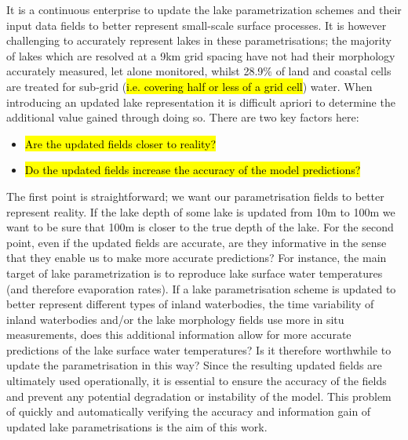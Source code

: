 \documentclass[hess, manuscript]{copernicus}
\begin{document}
\noindent It is a continuous enterprise to update the lake parametrization schemes and their input data fields to better represent small-scale surface processes. It is however challenging to accurately represent lakes in these parametrisations; the majority of lakes which are resolved at a 9km grid spacing have not had their morphology accurately measured, let alone monitored, whilst 28.9$\%$ of land and coastal cells are treated for sub-grid (\hl{i.e. covering half or less of a grid cell}) water. When introducing an updated lake representation it is difficult apriori to determine the additional value gained through doing so. There are two key factors here:
\begin{itemize}
	\item \hl{Are the updated fields closer to reality?}
	\item \hl{Do the updated fields increase the accuracy of the model predictions?} 
\end{itemize}
The first point is straightforward; we want our parametrisation fields to better represent reality. If the lake depth of some lake is updated from 10m to 100m we want to be sure that 100m is closer to the true depth of the lake. For the second point, even if the updated fields are accurate, are they informative in the sense that they enable us to make more accurate predictions? For instance, the main target of lake parametrization is to reproduce lake surface water temperatures (and therefore evaporation rates). If a lake parametrisation scheme is updated to better represent different types of inland waterbodies, the time variability of inland waterbodies and/or the lake morphology fields use more in situ measurements, does this additional information allow for more accurate predictions of the lake surface water temperatures? Is it therefore worthwhile to update the parametrisation in this way? Since the resulting updated fields are ultimately used operationally, it is essential to ensure the accuracy of the fields and prevent any potential degradation or instability of the model. This problem of quickly and automatically verifying the accuracy and information gain of updated lake parametrisations is the aim of this work. \newline
\end{document}
